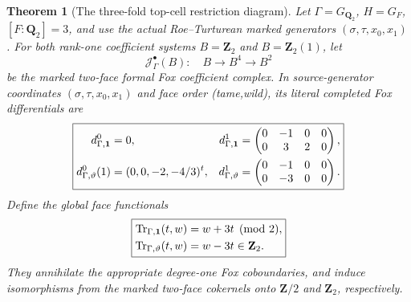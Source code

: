 \documentclass[11pt]{article}
\newtheorem{theorem}{Theorem}[section]
\theoremstyle{definition}
\begin{document}
\begin{theorem}[The three-fold top-cell restriction diagram]
\label{thm:dyadic-f134-top-transfer-three}
Let $\Gamma=G_{\mathbf Q_2}$,
$H=G_F$,
$[F:\mathbf Q_2]=3$,
and use the actual
Roe--Turturean marked
generators
$(\sigma,\tau,x_0,x_1)$.
For both rank-one
coefficient systems
$B=\mathbf Z_2$
and $B=\mathbf Z_2(1)$,
let
\[
\mathcal J_\Gamma^\bullet(B):
\quad B\to B^4\to B^2
\]
be the marked
two-face \emph{formal}
Fox coefficient
complex.
In source-generator
coordinates
$(\sigma,\tau,x_0,x_1)$
and face order
(tame,wild),
its literal
completed Fox
differentials are
\begin{equation}\label{eq:dyadic-f134-full-marked-two-twist-rows}
\boxed{
\begin{aligned}
d_{\Gamma,\bf1}^0&=0,&
d_{\Gamma,\bf1}^1&=
\begin{pmatrix}
0&-1&0&0\\
0&3&2&0
\end{pmatrix},
\\
d_{\Gamma,\vartheta}^0(1)
&=(0,0,-2,-4/3)^t,&
d_{\Gamma,\vartheta}^1&=
\begin{pmatrix}
0&-1&0&0\\
0&-3&0&0
\end{pmatrix}.
\end{aligned}}
\end{equation}
Define the global
face functionals
\begin{equation}\label{eq:dyadic-f134-global-marked-top-readout}
\boxed{
\begin{aligned}
\operatorname{Tr}_{\Gamma,\bf1}(t,w)
&=w+3t\pmod2,\\
\operatorname{Tr}_{\Gamma,\vartheta}(t,w)
&=w-3t\in\mathbf Z_2.
\end{aligned}}
\end{equation}
They annihilate
the appropriate
degree-one
Fox coboundaries,
and induce
isomorphisms from
the marked
two-face cokernels
onto
$\mathbf Z/2$
and
$\mathbf Z_2$,
respectively.


\end{theorem}
\end{document}
